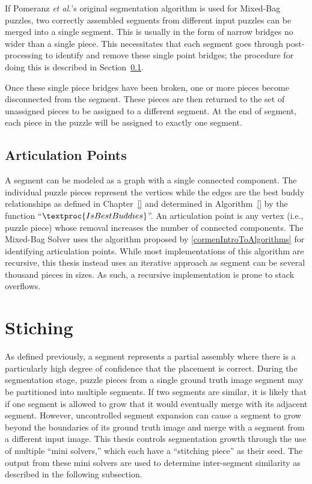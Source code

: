 If Pomeranz \textit{et al.}'s original segmentation algorithm is used for Mixed-Bag puzzles, two correctly assembled segments from different input puzzles can be merged into a single segment.  This is usually in the form of narrow bridges no wider than a single piece. This necessitates that each segment goes through post-processing to identify and remove these single point bridges; the procedure for doing this is described in Section~\ref{sec:ArticulationPoints}.  

Once these single piece bridges have been broken, one or more pieces become disconnected from the segment.  These pieces are then returned to the set of unassigned pieces to be assigned to a different segment.  At the end of segment, each piece in the puzzle will be assigned to exactly one segment.

\subsection{Articulation Points}\label{sec:ArticulationPoints}

A segment can be modeled as a graph with a single connected component.  The individual puzzle pieces represent the vertices while the edges are the best buddy relationships as defined in Chapter~\ref{} and determined in Algorithm~\ref{} by the function ``$\textproc{IsBestBuddies}$''.  An articulation point is any vertex (i.e., puzzle piece) whose removal increases the number of connected components.  The Mixed-Bag Solver uses the algorithm proposed by \ref{cormenIntroToAlgorithms} for identifying articulation points.  While most implementations of this algorithm are recursive, this thesis instead uses an iterative approach as segment can be several thousand pieces in sizes.  As such, a recursive implementation is prone to stack overflows.

\section{Stiching}\label{sec:stitchingPieceSolving}

As defined previously, a segment represents a partial assembly where there is a particularly high degree of confidence that the placement is correct. During the segmentation stage, puzzle pieces from a single ground truth image segment may be partitioned into multiple segments. If two segments are similar, it is likely that if one segment is allowed to grow that it would eventually merge with its adjacent segment.  However, uncontrolled segment expansion can cause a segment to grow beyond the boundaries of its ground truth image and merge with a segment from a different input image.  This thesis controls segmentation growth through the use of multiple ``mini solvers,'' which each have a ``stitching piece'' as their seed.  The output from these mini solvers are used to determine inter-segment similarity as described in the following subsection.

